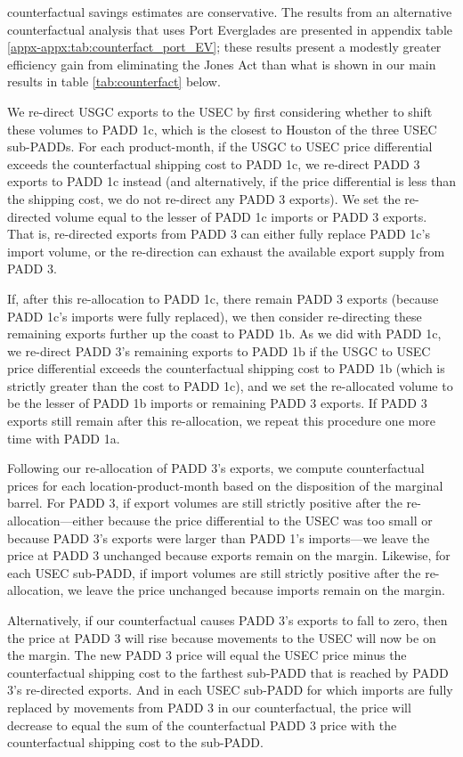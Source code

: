 \documentclass[12pt]{article}
\begin{document}
counterfactual savings estimates are conservative. The results from an alternative counterfactual analysis that uses Port Everglades are presented in appendix table \ref{appx-appx:tab:counterfact_port_EV}; these results present a modestly greater efficiency gain from eliminating the Jones Act than what is shown in our main results in table \ref{tab:counterfact} below.

We re-direct USGC exports to the USEC by first considering whether to shift these volumes to PADD 1c, which is the closest to Houston of the three USEC sub-PADDs. For each product-month, if the USGC to USEC price differential exceeds the counterfactual shipping cost to PADD 1c, we re-direct PADD 3 exports to PADD 1c instead (and alternatively, if the price differential is less than the shipping cost, we do not re-direct any PADD 3 exports). We set the re-directed volume equal to the lesser of PADD 1c imports or PADD 3 exports. That is, re-directed exports from PADD 3 can either fully replace PADD 1c's import volume, or the re-direction can exhaust the available export supply from PADD 3.

If, after this re-allocation to PADD 1c, there remain PADD 3 exports (because PADD 1c's imports were fully replaced), we then consider re-directing these remaining exports further up the coast to PADD 1b. As we did with PADD 1c, we re-direct PADD 3's remaining exports to PADD 1b if the USGC to USEC price differential exceeds the counterfactual shipping cost to PADD 1b (which is strictly greater than the cost to PADD 1c), and we set the re-allocated volume to be the lesser of PADD 1b imports or remaining PADD 3 exports. If PADD 3 exports still remain after this re-allocation, we repeat this procedure one more time with PADD 1a.

Following our re-allocation of PADD 3's exports, we compute counterfactual prices for each location-product-month based on the disposition of the marginal barrel. For PADD 3, if export volumes are still strictly positive after the re-allocation---either because the price differential to the USEC was too small or because PADD 3's exports were larger than PADD 1's imports---we leave the price at PADD 3 unchanged because exports remain on the margin. Likewise, for each USEC sub-PADD, if import volumes are still strictly positive after the re-allocation, we leave the price unchanged because imports remain on the margin.

Alternatively, if our counterfactual causes PADD 3's exports to fall to zero, then the price at PADD 3 will rise because movements to the USEC will now be on the margin. The new PADD 3 price will equal the USEC price minus the counterfactual shipping cost to the farthest sub-PADD that is reached by PADD 3's re-directed exports. And in each USEC sub-PADD for which imports are fully replaced by movements from PADD 3 in our counterfactual, the price will decrease to equal the sum of the counterfactual PADD 3 price with the counterfactual shipping cost to the sub-PADD.
\end{document}

